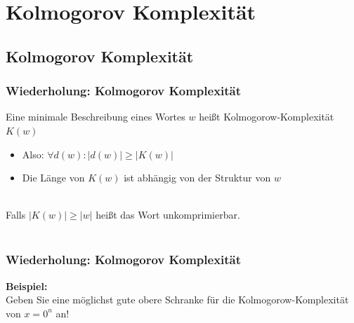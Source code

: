 




\section{Kolmogorov Komplexität}
\subsection{Kolmogorov Komplexität}
\begin{frame}
	\frametitle{Wiederholung: Kolmogorov Komplexität}
	Eine minimale Beschreibung eines Wortes $w$ heißt Kolmogorow-Komplexität $K(w)$
	\begin{itemize}
		\item Also: $\forall d(w): |d(w)| \geq |K(w)|$
		\item Die Länge von $K(w)$ ist abhängig von der Struktur von $w$
	\end{itemize}~\\
	Falls $|K(w)| \geq |w|$ heißt das Wort unkomprimierbar.~\\~\\
\end{frame}
\begin{frame}
	\frametitle{Wiederholung: Kolmogorov Komplexität}
	\textbf{Beispiel:}
	\\Geben Sie eine möglichst gute obere Schranke für die Kolmogorow-Komplexität von $x=0^n$ an!
	\begin{itemize}
	\end{itemize}
\end{frame}
